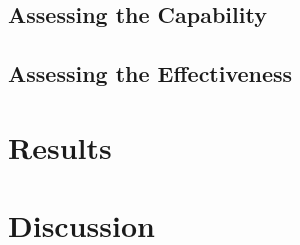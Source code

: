 \subsection{Assessing the Capability}


\subsection{Assessing the Effectiveness}

\section{Results}

\section{Discussion}
